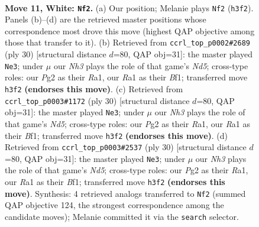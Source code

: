 \documentclass[11pt]{article}
\begin{document}
\clearpage

\begin{figure}[p]\centering
\begin{subfigure}{0.46\textwidth}\centering
\resizebox{\linewidth}{!}{%
\newchessgame
\chessboard[
  setfen={rnb1k2r/pppn1p2/4p3/3pP2p/N2P3q/7N/PPP3PP/R2QKB1R w KQkq - 2 11},
  showmover=false,
  pgfstyle=straightmove, color=movearrow, markmove={h3-f2}
]}
\caption{}
\end{subfigure}\hfill
\begin{subfigure}{0.46\textwidth}\centering
\resizebox{\linewidth}{!}{%
\newchessgame
\chessboard[
  setfen={r3k2r/1p4b1/p1npp2p/q2Nn1p1/8/2P3BP/PP3PP1/R2QKB1R w KQkq - 0 16},
  showmover=false,
  pgfstyle=straightmove, color=movearrow, markmove={d5-e3}
]}
\caption{}
\end{subfigure}
\\[4pt]
\begin{subfigure}{0.46\textwidth}\centering
\resizebox{\linewidth}{!}{%
\newchessgame
\chessboard[
  setfen={r3k2r/1p4b1/p1npp2p/q2Nn1p1/8/2P3BP/PP3PP1/R2QKB1R w KQkq - 0 16},
  showmover=false,
  pgfstyle=straightmove, color=movearrow, markmove={d5-e3}
]}
\caption{}
\end{subfigure}\hfill
\begin{subfigure}{0.46\textwidth}\centering
\resizebox{\linewidth}{!}{%
\newchessgame
\chessboard[
  setfen={r3k2r/1p4b1/p1npp2p/q2Nn1p1/8/2P3BP/PP3PP1/R2QKB1R w KQkq - 0 16},
  showmover=false,
  pgfstyle=straightmove, color=movearrow, markmove={d5-e3}
]}
\caption{}
\end{subfigure}
\caption{\textbf{Move 11, White: \texttt{Nf2}.} (a) Our position; Melanie plays \texttt{Nf2} (\texttt{h3f2}). Panels (b)--(d) are the retrieved master positions whose correspondence most drove this move (highest QAP objective among those that transfer to it). (b) Retrieved from \texttt{ccrl\_top\_p0002\#2689} (ply 30) [structural distance $d$=80, QAP obj=31]: the master played \texttt{Ne3}; under $\mu$ our \emph{Nh3} plays the role of that game's \emph{Nd5}; cross-type roles: our \emph{P}g2 as their \emph{R}a1, our \emph{R}a1 as their \emph{B}f1; transferred move \texttt{h3f2} \textbf{(endorses this move)}. (c) Retrieved from \texttt{ccrl\_top\_p0003\#1172} (ply 30) [structural distance $d$=80, QAP obj=31]: the master played \texttt{Ne3}; under $\mu$ our \emph{Nh3} plays the role of that game's \emph{Nd5}; cross-type roles: our \emph{P}g2 as their \emph{R}a1, our \emph{R}a1 as their \emph{B}f1; transferred move \texttt{h3f2} \textbf{(endorses this move)}. (d) Retrieved from \texttt{ccrl\_top\_p0003\#2537} (ply 30) [structural distance $d$=80, QAP obj=31]: the master played \texttt{Ne3}; under $\mu$ our \emph{Nh3} plays the role of that game's \emph{Nd5}; cross-type roles: our \emph{P}g2 as their \emph{R}a1, our \emph{R}a1 as their \emph{B}f1; transferred move \texttt{h3f2} \textbf{(endorses this move)}. Synthesis: 4 retrieved analogs transferred to \texttt{Nf2} (summed QAP objective 124, the strongest correspondence among the candidate moves); Melanie committed it via the \texttt{search} selector.}
\label{fig:thought-m20}
\end{figure}
\end{document}
